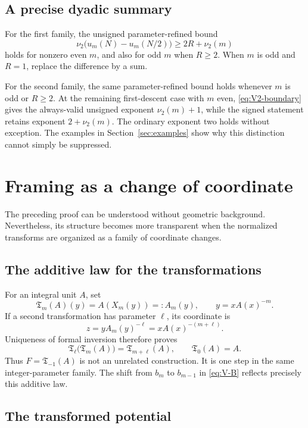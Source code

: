 \documentclass[11pt,letterpaper]{article}
\numberwithin{equation}{section}
\theoremstyle{definition}
\begin{document}
\subsection{A precise dyadic summary}

For the first family, the unsigned parameter-refined bound
\[
\nu_2\bigl(u_m(N)-u_m(N/2)\bigr)\geq2R+\nu_2(m)
\]
holds for nonzero even $m$, and also for odd $m$ when $R\geq2$.
When $m$ is odd and $R=1$, replace the difference by a sum.

For the second family, the same parameter-refined bound holds whenever
$m$ is odd or $R\geq2$. At the remaining first-descent case with $m$
even, \eqref{eq:V2-boundary} gives the always-valid unsigned exponent
$\nu_2(m)+1$, while the signed statement retains exponent
$2+\nu_2(m)$. The ordinary exponent two holds without exception.
The examples in Section~\ref{sec:examples} show why this distinction
cannot simply be suppressed.

\section{Framing as a change of coordinate}\label{sec:framing}

The preceding proof can be understood without geometric background.
Nevertheless, its structure becomes more transparent when the normalized
transforms are organized as a family of coordinate changes.

\subsection{The additive law for the transformations}

For an integral unit $A$, set
\[
\mathfrak T_m(A)(y)=A(X_m(y))=:A_m(y),
\qquad y=xA(x)^{-m}.
\]
If a second transformation has parameter $\ell$, its coordinate is
\[
z=yA_m(y)^{-\ell}=xA(x)^{-(m+\ell)}.
\]
Uniqueness of formal inversion therefore proves
\begin{equation}\label{eq:group}
\mathfrak T_\ell\bigl(\mathfrak T_m(A)\bigr)
=\mathfrak T_{m+\ell}(A),\qquad
\mathfrak T_0(A)=A.
\end{equation}
Thus $F=\mathfrak T_{-1}(A)$ is not an unrelated construction. It is
one step in the same integer-parameter family. The shift from $b_m$ to
$b_{m-1}$ in \eqref{eq:V-B} reflects precisely this additive law.

\subsection{The transformed potential}
\end{document}
